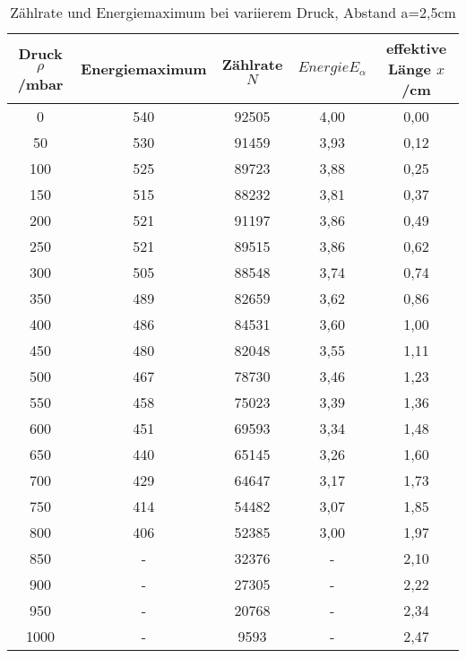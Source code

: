 \begin{table}[H]
  \centering
  \caption{Zählrate und Energiemaximum bei variierem Druck, Abstand a=2,5cm}
  \label{tab:tab1}
    \begin{tabular}{c c c c c}
    \toprule
    Druck $\rho$/\;mbar & Energiemaximum & Zählrate $N$ & $Energie E_{\alpha}$ & effektive Länge $x$/\;cm\\
    \midrule
    0 & 540 & 92505 & 4,00 & 0,00\\
    50 & 530 & 91459& 3,93 & 0,12\\
    100 & 525 & 89723& 3,88 & 0,25\\
    150 & 515 & 88232& 3,81 & 0,37\\
    200 & 521 & 91197&3,86 & 0,49\\
    250 & 521 & 89515& 3,86 & 0,62\\
    300 & 505 & 88548& 3,74& 0,74\\
    350 & 489 & 82659& 3,62 & 0,86\\
    400 & 486 & 84531 & 3,60 & 1,00\\
    450 & 480 & 82048 & 3,55 & 1,11\\
    500 & 467 & 78730 & 3,46 & 1,23\\
    550 & 458 & 75023 & 3,39 & 1,36\\
    600 & 451 & 69593 & 3,34 & 1,48\\
    650 & 440 & 65145& 3,26 & 1,60\\
    700 & 429 & 64647& 3,17 & 1,73\\
    750 & 414 & 54482& 3,07 & 1,85\\
    800 & 406 & 52385& 3,00 & 1,97\\
    850 & -   & 32376& - & 2,10\\
    900 & -   & 27305& -  & 2,22\\
    950 & -   & 20768& -  & 2,34\\
    1000& -   & 9593& -    & 2,47\\
    \bottomrule
    \end{tabular}
  \end{table}
